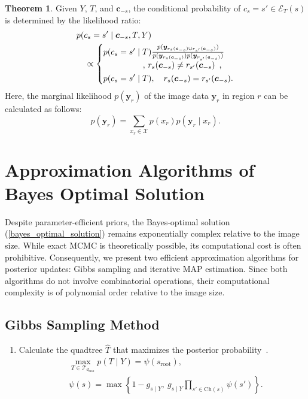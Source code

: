 \documentclass[conference]{IEEEtran}
\theoremstyle{definition}
\newtheorem{thm}{Theorem}
\begin{document}
\begin{thm}
  Given $Y$, $T$, and $\bm{c}_{-s}$, the conditional probability of $c_s = s' \in \mathcal{E}_T(s)$ is determined by the likelihood ratio:
\begin{align}
  &p(c_s = s' \mid \bm{c}_{-s}, T, Y) \nonumber \\
  &\quad \propto \begin{dcases}
    \begin{array}{@{}l@{}}
      p(c_s = s' \mid T) \frac{p(\bm{y}_{r_s(\bm{c}_{-s}) \cup r_{s'}(\bm{c}_{-s})})}{p(\bm{y}_{r_s(\bm{c}_{-s})}) p(\bm{y}_{r_{s'}(\bm{c}_{-s})})} \\
      \multicolumn{1}{r}{, \, r_s(\bm{c}_{-s}) \neq r_{s'}(\bm{c}_{-s})},
    \end{array} \\
    p(c_s = s' \mid T) , \quad r_s(\bm{c}_{-s}) = r_{s'}(\bm{c}_{-s}).
  \end{dcases}
\end{align}
  Here, the marginal likelihood $p(\bm{y}_r)$ of the image data $\bm{y}_r$ in region $r$ can be calculated as follows:
  \begin{equation}
    p(\bm{y}_r) = \sum_{x_r \in \mathcal{X}} p(x_r) p(\bm{y}_r \mid x_r).
  \end{equation}
  \label{posterior_R}
\end{thm}

\section{Approximation Algorithms of Bayes Optimal Solution}

Despite parameter-efficient priors, the Bayes-optimal solution (\ref{bayes_optimal_solution}) remains exponentially complex relative to the image size. While exact MCMC is theoretically possible, its computational cost is often prohibitive. Consequently, we present two efficient approximation algorithms for posterior updates: Gibbs sampling and iterative MAP estimation.
Since both algorithms do not involve combinatorial operations, their computational complexity is of polynomial order relative to the image size.

\subsection{Gibbs Sampling Method}

\begin{enumerate}
  \item Calculate the quadtree $\hat{T}$ that maximizes the posterior probability~\cite{nakahara_full_rooted_trees}.
      \begin{align}
        &\max_{T \in \mathcal{T}_{d_{\mathrm{max}}}} p(T \mid Y) = \psi (s_{\text{root}}),\\
        &\psi(s) = \max \left\{ 1 - g_{s \mid Y}, \ g_{s \mid Y} \prod_{s' \in \mathrm{Ch}(s)} \psi(s') \right\}.
      \end{align}
\end{enumerate}
\end{document}

